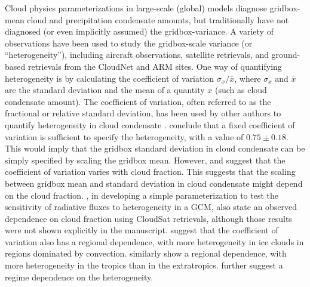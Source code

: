 Cloud physics parameterizations in large-scale (global) models diagnose
gridbox-mean cloud and precipitation condensate amounts, but
traditionally have not diagnosed (or even implicitly assumed) the
gridbox-variance. A variety of observations have been used to study the
gridbox-scale variance (or ``heterogeneity''), including aircraft
observations, satellite retrievals, and ground-based retrievals from the
CloudNet \citep{illingworth_et_al_2007} and ARM
\citep{ackerman_and_stokes_2003} sites. One way of quantifying
heterogeneity is by calculating the coefficient of variation
\(\sigma_x / \overline{x}\), where \(\sigma_x\) and \(\overline{x}\) are
the standard deviation and the mean of a quantity \(x\) (such as cloud
condensate amount). The coefficient of variation, often referred to as
the fractional or relative standard deviation, has been used by other
authors to quantify heterogeneity in cloud condensate
\citep{hogan_and_illingworth_2003, shonk_et_al_2010, hill_et_al_2012, boutle_et_al_2014}.
\citet{shonk_et_al_2010} conclude that a fixed coefficient of variation
is sufficient to specify the heterogeneity, with a value of
\(0.75 \pm 0.18\). This would imply that the gridbox standard deviation
in cloud condensate can be simply specified by scaling the gridbox mean.
However, \citet{hill_et_al_2012} and \citet{boutle_et_al_2014} suggest
that the coefficient of variation varies with cloud fraction. This
suggests that the scaling between gridbox mean and standard deviation in
cloud condensate might depend on the cloud fraction.
\citet{oreopoulos_et_al_2012}, in developing a simple parameterization
to test the sensitivity of radiative fluxes to heterogeneity in a GCM,
also state an observed dependence on cloud fraction using CloudSat
retrievals, although those results were not shown explicitly in the
manuscript. \citet{hill_et_al_2015} suggest that the coefficient of
variation also has a regional dependence, with more heterogeneity in ice
clouds in regions dominated by convection. \citet{lebsock_et_al_2013}
similarly show a regional dependence, with more heterogeneity in the
tropics than in the extratropics. \citet{ahlgrimm_and_forbes_2016}
further suggest a regime dependence on the heterogeneity.


